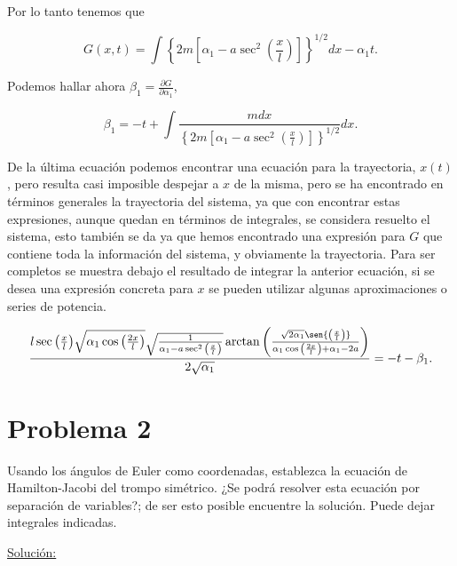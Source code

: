 \documentclass[a4paper,10pt]{article}
\numberwithin{equation}{section}
\begin{document}
Por lo tanto tenemos que 

\begin{equation}
 G(x,t) =  \int \left\{2m\left[\alpha_1 - a\sec^2{\left(\frac{x}{l}\right)}\right]\right\}^{1/2}dx
 - \alpha_1t.
\end{equation}

Podemos hallar ahora $\beta_1 = \frac{\partial G}{\partial \alpha_1}$, 

\begin{equation}
 \beta_1 = - t + \int \frac{mdx}{\left\{2m\left[\alpha_1 - a\sec^2{\left(\frac{x}{l}\right)}\right]\right\}^{1/2}}dx.
\end{equation}

De la última ecuación podemos encontrar una ecuación para la trayectoria, $x(t)$, pero 
resulta casi imposible despejar a $x$ de la misma, pero se ha encontrado en términos 
generales la trayectoria del sistema, ya que con encontrar estas expresiones, aunque 
quedan en términos de integrales, se considera resuelto el sistema, esto también 
se da ya que hemos encontrado una expresión para $G$ que contiene toda la información 
del sistema, y obviamente la trayectoria. Para ser completos se muestra debajo el 
resultado de integrar la anterior ecuación, si se desea una expresión 
concreta para $x$ se pueden utilizar algunas aproximaciones o series de potencia.

\begin{equation}
\frac{l\sec{\left(\frac{x}{l}\right)}\sqrt{\alpha_1\cos{\left(\frac{2x}{l}\right)}}
\sqrt{\frac{1}{\alpha_1 - a\sec^2{\left(\frac{x}{l}\right)}}}
\arctan{\left(\frac{\sqrt{2\alpha_1}\sen{\left(\frac{x}{l}\right)}}{\alpha_1\cos{\left(\frac{2x}{l}\right)+ \alpha_1 - 2a}}\right)}}{2\sqrt{\alpha_1}}
= - t - \beta_1.
\end{equation}

\section{Problema 2}

Usando los ángulos de Euler como coordenadas, establezca la ecuación de Hamilton-Jacobi 
del trompo simétrico. ¿Se podrá resolver esta ecuación por separación de variables?; 
de ser esto posible encuentre la solución. Puede dejar integrales indicadas.

\vspace{.3cm}

\underline{Solución:} \vspace{.3cm}
\end{document}

